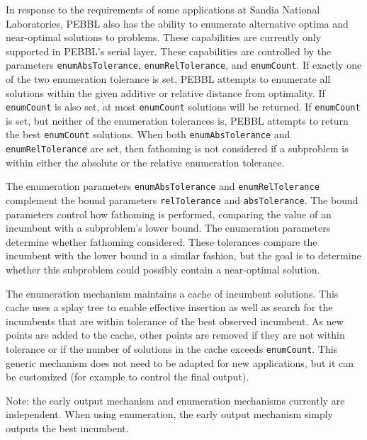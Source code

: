 \begin{description}
In response to the requirements of some applications at Sandia
National Laboratories, PEBBL also has the ability to enumerate
alternative optima and near-optimal solutions to problems.  These
capabilities are currently only supported in PEBBL's serial layer.
These capabilities are controlled by the parameters
\texttt{enumAbsTolerance}, \texttt{enumRelTolerance}, and
\texttt{enumCount}.  If exactly one of the two enumeration tolerance
is set, PEBBL attempts to enumerate all solutions within the given
additive or relative distance from optimality.  If \texttt{enumCount}
is also set, at most \texttt{enumCount} solutions will be returned.
If \texttt{enumCount} is set, but neither of the enumeration
tolerances is, PEBBL attempts to return the best \texttt{enumCount}
solutions.  When both \texttt{enumAbsTolerance} and
\texttt{enumRelTolerance} are set, then fathoming is not considered if
a subproblem is within either the absolute or the relative enumeration
tolerance.

The enumeration parameters \texttt{enumAbsTolerance} and
\texttt{enumRelTolerance} complement the bound parameters
\texttt{relTolerance} and \texttt{absTolerance}.  The bound parameters
control how fathoming is performed, comparing the value of an
incumbent with a subproblem's lower bound.  The enumeration parameters
determine whether fathoming considered.  These tolerances compare the
incumbent with the lower bound in a similar fashion, but the goal is
to determine whether this subproblem could possibly contain a
near-optimal solution.

The enumeration mechanism maintains a cache of incumbent solutions.
This cache uses a splay tree to enable effective insertion as well as
search for the incumbents that are within tolerance of the best
observed incumbent.  As new points are added to the cache, other
points are removed if they are not within tolerance or if the number
of solutions in the cache exceeds \texttt{enumCount}.  This generic
mechanism does not need to be adapted for new applications, but it can
be customized (for example to control the final output).

Note: the early output mechanism and enumeration mechanisms currently
are independent.  When using enumeration, the early output mechanism
simply outputs the best incumbent.

\end{description}
